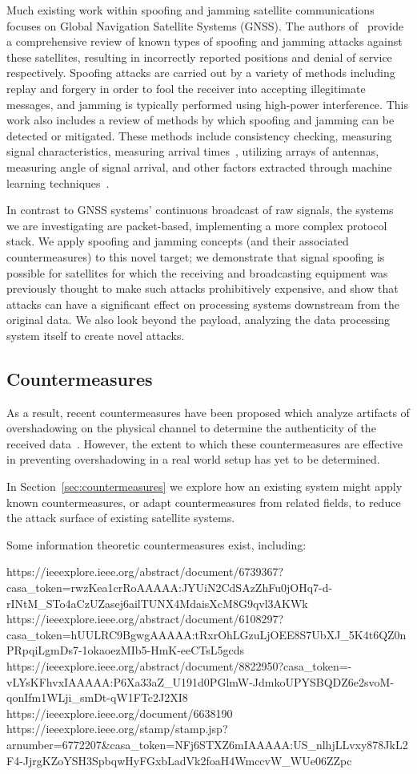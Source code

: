 Much existing work within spoofing and jamming satellite communications focuses on Global Navigation Satellite Systems (GNSS).
The authors of~\cite{wuSpoofing2020} provide a comprehensive review of known types of spoofing and jamming attacks against these satellites, resulting in incorrectly reported positions and denial of service respectively.
Spoofing attacks are carried out by a variety of methods including replay and forgery in order to fool the receiver into accepting illegitimate messages, and jamming is typically performed using high-power interference.
This work also includes a review of methods by which spoofing and jamming can be detected or mitigated.
These methods include consistency checking, measuring signal characteristics, measuring arrival times~\cite{jedermann2021orbit}, utilizing arrays of antennas, measuring angle of signal arrival, and other factors extracted through machine learning techniques~\cite{oligeri2020past}.

In contrast to GNSS systems' continuous broadcast of raw signals, the systems we are investigating are packet-based, implementing a more complex protocol stack.
We apply spoofing and jamming concepts (and their associated countermeasures) to this novel target; we demonstrate that signal spoofing is possible for satellites for which the receiving and broadcasting equipment was previously thought to make such attacks prohibitively expensive, and show that attacks can have a significant effect on processing systems downstream from the original data.
We also look beyond the payload, analyzing the data processing system itself to create novel attacks.
\subsection{Countermeasures}

As a result, recent countermeasures have been proposed which analyze artifacts of overshadowing on the physical channel to determine the authenticity of the received data~\cite{jedermann2021orbit,oligeri2020past}.
However, the extent to which these countermeasures are effective in preventing overshadowing in a real world setup has yet to be determined.

In Section~\ref{sec:countermeasures} we explore how an existing system might apply known countermeasures, or adapt countermeasures from related fields, to reduce the attack surface of existing satellite systems.

Some information theoretic countermeasures exist, including:

https://ieeexplore.ieee.org/abstract/document/6739367?casa_token=rwzKea1crRoAAAAA:JYUiN2CdSAzZhFu0jOHq7-d-rINtM_STo4aCzUZasej6ailTUNX4MdaisXcM8G9qvl3AKWk
https://ieeexplore.ieee.org/abstract/document/6108297?casa_token=hUULRC9BgwgAAAAA:tRxrOhLGzuLjOEE8S7UbXJ_5K4t6QZ0nPRpqiLgmDs7-1okaoezMIb5-HmK-eeCTsL5gcds
https://ieeexplore.ieee.org/abstract/document/8822950?casa_token=-vLYsKFhvxIAAAAA:P6Xa33aZ_U191d0PGlmW-JdmkoUPYSBQDZ6e2svoM-qonIfm1WLji_smDt-qW1FTc2J2XI8
https://ieeexplore.ieee.org/document/6638190
https://ieeexplore.ieee.org/stamp/stamp.jsp?arnumber=6772207&casa_token=NFj6STXZ6mIAAAAA:US_nlhjLLvxy878JkL2F4-JjrgKZoYSH3SpbqwHyFGxbLadVk2foaH4WmccvW_WUe06ZZpc
